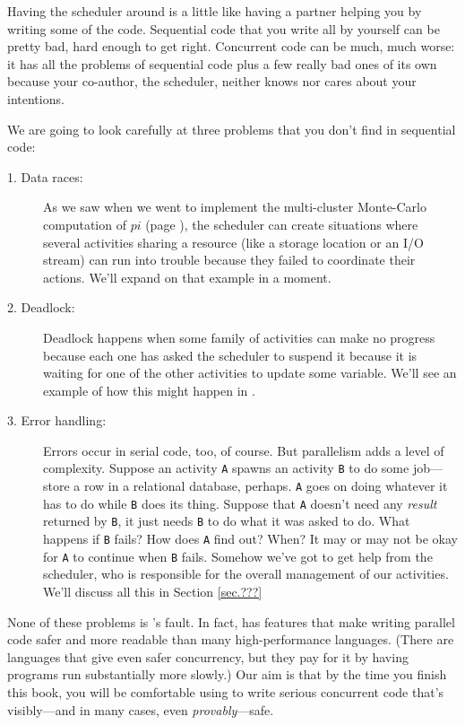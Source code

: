 Having the scheduler around is a little like having a partner helping you by
writing some of the code.  Sequential code that you write all by 
yourself can be pretty bad, hard enough to get right.  Concurrent code
can be much, much worse: it has all the problems of sequential 
code plus a few really bad ones of its own because your co-author,
the scheduler, neither knows nor cares about your intentions.

We are going to look carefully at three problems that you don't find in
sequential code:

\begin{description}
\item[1. Data races: ]
As we saw when we went to implement the multi-cluster Monte-Carlo computation
of $pi$ (page \pageref{verb:montepierror}), the scheduler can create situations
where several activities sharing a resource (like a storage location or an I/O stream)
can run into trouble because they failed to coordinate their actions.  We'll expand
on that example in a moment.
\item[2. Deadlock: ]
Deadlock happens when some family of activities can make no progress because
each one has asked the scheduler to  suspend it because it is waiting for one of
the other activities to update some variable. We'll see an example of how this
might happen in .
\item[3. Error handling: ]
Errors occur in serial code, too, of course.  But parallelism adds a level of 
complexity.  Suppose an activity {\tt A} spawns an activity {\tt B} to do some
job---store a row in a relational database, perhaps.  {\tt A} goes on doing
whatever it has to do while {\tt B} does its thing.  
Suppose that {\tt A} doesn't need any {\em result} returned by {\tt B},
it just needs {\tt B} to do what it was asked to do.  What happens
if  {\tt B}
fails?  How does {\tt A} find out?  When?  It may or may not be okay for
{\tt A} to continue when {\tt B} fails.  Somehow we've got to get 
help from the scheduler, who is responsible for the overall management
of our activities. We'll discuss all
this in Section \ref{sec.???}
\end{description} 

None of these problems is \Xten{}'s fault.  In fact, \Xten{} has features that make
writing parallel code safer and more readable than many high-performance languages.
(There are languages that give even
safer concurrency, but they pay for it by having programs run substantially
more slowly.)  Our aim is that by the time you finish this book, you will be comfortable
using \Xten{} to write serious concurrent code that's visibly---and in many
cases, even {\em provably}---safe.

